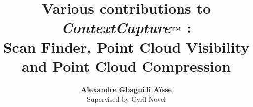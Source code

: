\documentclass[a4paper,11pt,twoside]{report}
\newcommand{\CC }{\emph{ContextCapture$^{\text{\textbf{TM}}}$ }}
\begin{document}
\title{\LARGE {\bf Various contributions to \CC:\\Scan Finder, Point Cloud Visibility and Point Cloud Compression}\\
 \vspace*{6mm}
}

\author{{\bf Alexandre Gbaguidi A\"isse}\\\vspace{3cm}Supervised by Cyril Novel}

\normallinespacing
\maketitle

\preface




\body









\appendix




\end{document}
